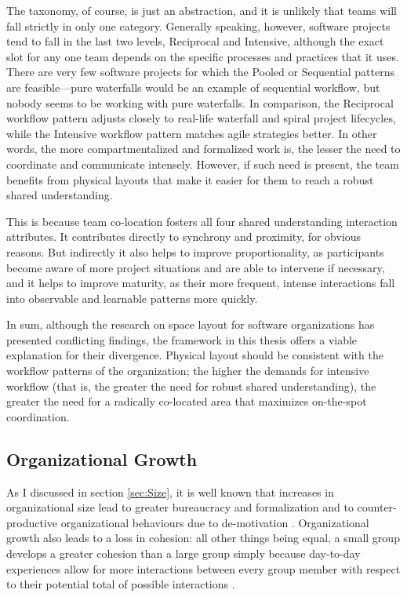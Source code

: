 The taxonomy, of course, is just an abstraction, and it is unlikely that teams will fall strictly in only one category. Generally speaking, however, software projects tend to fall in the last two levels, Reciprocal and Intensive, although the exact slot for any one team depends on the specific processes and practices that it uses. There are very few software projects for which the Pooled or Sequential patterns are feasible---pure waterfalls would be an example of sequential workflow, but nobody seems to be working with pure waterfalls. In comparison, the Reciprocal workflow pattern adjusts closely to real-life waterfall and spiral project lifecycles, while the Intensive workflow pattern matches agile strategies better. In other words, the more compartmentalized and formalized work is, the lesser the need to coordinate and communicate intensely. However, if such need is present, the team benefits from physical layouts that make it easier for them to reach a robust shared understanding.

This is because team co-location fosters all four shared understanding interaction attributes. It contributes directly to synchrony and proximity, for obvious reasons. But indirectly it also helps to improve proportionality, as participants become aware of more project situations and are able to intervene if necessary, and it helps to improve maturity, as their more frequent, intense interactions fall into observable and learnable patterns more quickly.

In sum, although the research on space layout for software organizations has presented conflicting findings, the framework in this thesis offers a viable explanation for their divergence. Physical layout should be consistent with the workflow patterns of the organization; the higher the demands for intensive workflow (that is, the greater the need for robust shared understanding), the greater the need for a radically co-located area that maximizes on-the-spot coordination.



\subsection{Organizational Growth}
\label{sec:SoftwareSize}

As I discussed in section \ref{sec:Size}, it is well known that increases in organizational size lead to greater bureaucracy and formalization \cite{Blau1971,Haveman1993} and to counter-productive organizational behaviours due to de-motivation \cite{Talacchi1960}. Organizational growth also leads to a loss in cohesion: all other things being equal, a small group develops a greater cohesion than a large group simply because day-to-day experiences allow for more interactions between every group member with respect to their potential total of possible interactions \cite{Homans1950}.


